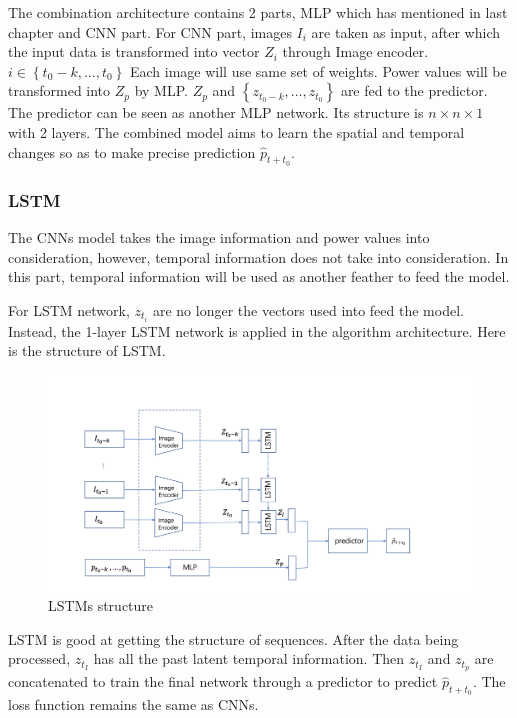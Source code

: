The combination architecture contains 2 parts, MLP which has mentioned in last chapter and CNN part. For CNN part, images $I_{i}$ are taken as input, after which the input data is transformed into vector $Z_{i}$ through Image encoder. $i\in \left \{ t_{0}-k, ... , t_{0} \right \}$ Each image will use same set of weights. Power values will be transformed into $Z_{p}$ by MLP. $Z_{p}$ and $\left \{ z_{t_{0}-k}, ... , z_{t_{0}} \right \}$ are fed to the predictor. The predictor can be seen as another MLP network. Its structure is $n \times n \times 1$ with 2 layers. The combined model aims to learn the spatial and temporal changes so as to make precise prediction $\hat{p}_{t+t_{0}}$.\\[2ex]


\subsubsection{LSTM}

The CNNs model takes the image information and power values into consideration, however, temporal information does not take into consideration. In this part, temporal information will be used as another feather to feed the model.

For LSTM network,  $z_{t_{i}}$ are no longer the vectors used into feed the model. Instead, the 1-layer LSTM network is applied in the algorithm architecture. Here is the structure of LSTM.

\begin{figure}[!ht]
	\centering
	\includegraphics[width=1.2\textwidth]{lstm.png}
	\caption{LSTMs structure\label{fig:lstm}}
\end{figure}

LSTM is good at getting the structure of sequences. After the data being processed, $z_{t_{I}}$ has all the past latent temporal information. Then $z_{t_{I}}$ and $z_{t_{p}}$ are concatenated to train the final network through a predictor to predict  $\hat{p}_{t+t_{0}}$. The loss function remains the same as CNNs.


